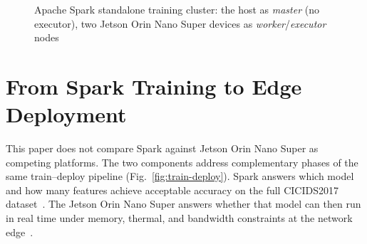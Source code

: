 \documentclass[runningheads]{llncs}
\begin{document}
\begin{figure}[htbp]
{}
  \caption{Apache Spark standalone training cluster: the host as \emph{master} (no executor), two Jetson Orin Nano Super devices as \emph{worker}/\emph{executor} nodes}
  \label{fig:spark-cluster}
\end{figure}

\section{From Spark Training to Edge Deployment}
\label{sec:bridge}

This paper does not compare Spark against Jetson Orin Nano Super as competing platforms. The two components address complementary phases of the same train--deploy pipeline (Fig.~\ref{fig:train-deploy}). Spark answers which model and how many features achieve acceptable accuracy on the full CICIDS2017 dataset~\cite{sharafaldin2018toward}. The Jetson Orin Nano Super answers whether that model can then run in real time under memory, thermal, and bandwidth constraints at the network edge~\cite{shi2016edge}.
\end{document}
